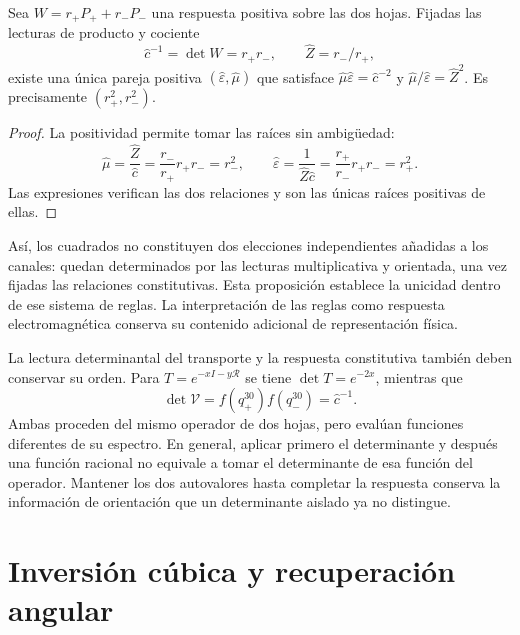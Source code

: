 \begin{proposition}
Sea $W=r_+P_++r_-P_-$ una respuesta positiva sobre las dos hojas.
Fijadas las lecturas de producto y cociente
\[
 \widehat c^{-1}=\det W=r_+r_-,
 \qquad \widehat Z=r_-/r_+,
\]
existe una única pareja positiva $(\widehat\varepsilon,\widehat\mu)$
que satisface
$\widehat\mu\widehat\varepsilon=\widehat c^{-2}$ y
$\widehat\mu/\widehat\varepsilon=\widehat Z^2$.
Es precisamente $(r_+^2,r_-^2)$.
\end{proposition}
\begin{proof}
La positividad permite tomar las raíces sin ambigüedad:
\[
 \widehat\mu=\frac{\widehat Z}{\widehat c}
 =\frac{r_-}{r_+}r_+r_-=r_-^2,\qquad
 \widehat\varepsilon=\frac1{\widehat Z\widehat c}
 =\frac{r_+}{r_-}r_+r_-=r_+^2.
\]
Las expresiones verifican las dos relaciones y son las únicas raíces
positivas de ellas.
\end{proof}

Así, los cuadrados no constituyen dos elecciones independientes añadidas
a los canales: quedan determinados por las lecturas multiplicativa y
orientada, una vez fijadas las relaciones constitutivas. Esta proposición
establece la unicidad dentro de ese sistema de reglas. La interpretación
de las reglas como respuesta electromagnética conserva su contenido
adicional de representación física.

La lectura determinantal del transporte y la respuesta constitutiva
también deben conservar su orden. Para $T=e^{-xI-y\mathcal R}$ se tiene
$\det T=e^{-2x}$, mientras que
\[
 \det\mathcal V=f(q_+^{30})f(q_-^{30})=\widehat c^{-1}.
\]
Ambas proceden del mismo operador de dos hojas, pero evalúan funciones
diferentes de su espectro. En general, aplicar primero el determinante
y después una función racional no equivale a tomar el determinante de
esa función del operador. Mantener los dos autovalores hasta completar
la respuesta conserva la información de orientación que un determinante
aislado ya no distingue.

\section{Inversión cúbica y recuperación angular}

